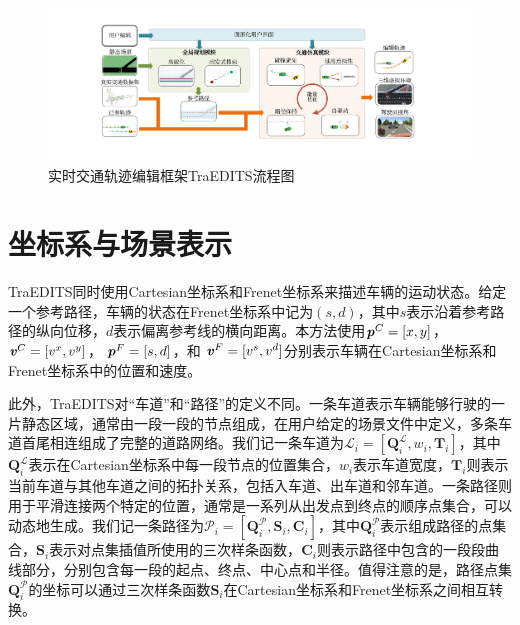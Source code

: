 \begin{figure}[!htb]
\centering
\includegraphics[width=\textwidth]{figure/traedits/overview 7_cn.pdf}
\caption[实时交通轨迹编辑框架TraEDITS流程图]{
实时交通轨迹编辑框架TraEDITS流程图
}
\label{fig:traedits_overview}
\end{figure}


\section{坐标系与场景表示}
\label{section:traedits_coordinate}

TraEDITS同时使用Cartesian坐标系和Frenet坐标系来描述车辆的运动状态。给定一个参考路径，车辆的状态在Frenet坐标系中记为$(s, d)$，其中$s$表示沿着参考路径的纵向位移，$d$表示偏离参考线的横向距离。本方法使用$\textbf{\emph{p}}^{C}=[x, y]$， $\textbf{\emph{v}}^{C}=[v^x, v^y]$， $\textbf{\emph{p}}^{F}=[s, d]$，和 $\textbf{\emph{v}}^{F}=[v^s, v^d]$分别表示车辆在Cartesian坐标系和Frenet坐标系中的位置和速度。

此外，TraEDITS对“车道”和“路径”的定义不同。一条车道表示车辆能够行驶的一片静态区域，通常由一段一段的节点组成，在用户给定的场景文件中定义，多条车道首尾相连组成了完整的道路网络。我们记一条车道为$\mathscr{L}_i = [\textbf{Q}^{\mathscr{L}}_{i}, w_i, \textbf{T}_{i}]$，其中$\textbf{Q}^{\mathscr{L}}_{i}$表示在Cartesian坐标系中每一段节点的位置集合，$w_i$表示车道宽度，$\textbf{T}_{i}$则表示当前车道与其他车道之间的拓扑关系，包括入车道、出车道和邻车道。一条路径则用于平滑连接两个特定的位置，通常是一系列从出发点到终点的顺序点集合，可以动态地生成。我们记一条路径为$\mathscr{P}_i = [\textbf{Q}^{\mathscr{P}}_{i}, \textbf{S}_{i}, \textbf{C}_{i}]$，其中$\textbf{Q}^{\mathscr{P}}_{i}$表示组成路径的点集合，$\textbf{S}_{i}$表示对点集插值所使用的三次样条函数，$\textbf{C}_{i}$则表示路径中包含的一段段曲线部分，分别包含每一段的起点、终点、中心点和半径。值得注意的是，路径点集$\textbf{Q}^{\mathscr{P}}_{i}$的坐标可以通过三次样条函数$\textbf{S}_{i}$在Cartesian坐标系和Frenet坐标系之间相互转换。

